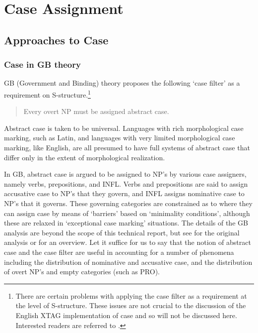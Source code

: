  
\chapter{Case Assignment} 
\label{case-assignment} 
\section{Approaches to Case} 
\subsection{Case in GB theory} 
 
GB (Government and Binding) theory proposes the following 
`case filter' as a requirement on S-structure.\footnote{There are certain problems with applying the case filter as a requirement at the level of S-structure.  These issues are not crucial to the discussion of the English XTAG implementation of case and so will not be discussed here.  Interested readers are referred to \cite{lasnik-uriagereka88}.} 
 
\begin{verse} 
Every overt NP must be assigned abstract case. \cite{haegeman91} 
\end{verse} 
 
Abstract case is taken to be universal.  Languages with rich morphological case 
marking, such as Latin, and languages with very limited morphological case 
marking, like English, are all presumed to have full systems of abstract case 
that differ only in the extent of morphological realization. 
 
In GB, abstract case is argued to be assigned to NP's by various case 
assigners, namely verbs, prepositions, and INFL.  Verbs and 
prepositions are said to assign accusative case to NP's that they 
govern, and INFL assigns nominative case to NP's that it governs. 
These governing categories are constrained as to where they can assign 
case by means of `barriers' based on `minimality conditions', although 
these are relaxed in `exceptional case marking' situations.  The 
details of the GB analysis are beyond the scope of this technical 
report, but see \cite{chomsky86} for the original analysis or 
\cite{haegeman91} for an overview.  Let it suffice for us to say that 
the notion of abstract case and the case filter are useful in 
accounting for a number of phenomena including the distribution of 
nominative and accusative case, and the distribution of overt NP's and 
empty categories (such as PRO). 
 
